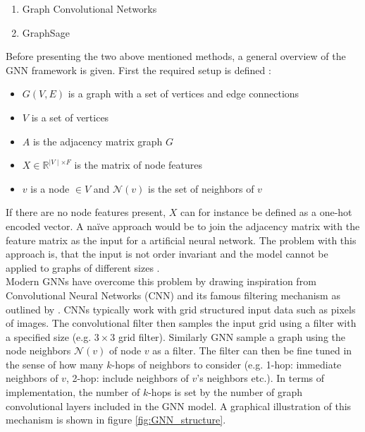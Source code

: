 	\begin{enumerate}
		\item Graph Convolutional Networks
		\item GraphSage
	\end{enumerate}
	
	\noindent Before presenting the two above mentioned methods, a general
	overview of the GNN framework is given. First the required setup is
	defined \citep{leskovec2021lecture}:

	\begin{itemize}
		\item $G(V,E)$ is a graph with a set of vertices and edge connections
		\item $V$ is a set of vertices
		\item $A$ is the adjacency matrix graph $G$
		\item $X \in \mathbb{R}^{\mid V\mid \times F}$ is the matrix of node
			features
		\item $v$ is a node $\in V$ and $\mathcal{N}(v)$ is the set of
			neighbors of $v$
	\end{itemize}

	\noindent If there are no node features present, $X$ can for instance be
	defined as a one-hot encoded vector. A naïve approach would be to join the 
	adjacency matrix with the feature matrix as the input for a artificial
	neural network. The problem with this approach is, that the input is not order 
	invariant and the model cannot be applied to graphs of different sizes
	\citep{leskovec2021lecture}. \\


	\noindent Modern GNNs have overcome this problem by drawing inspiration from 
	Convolutional Neural Networks (CNN) and its famous filtering mechanism as 
	outlined by \cite{krizhevsky2012imagenet}.
	CNNs typically work with grid structured input data such as pixels of
	images. The convolutional filter then samples the input grid using a
	filter with a specified size (e.g. $3\times3$ grid filter). Similarly GNN
	sample a graph using the node neighbors $\mathcal{N}(v)$ of node $v$ as a
	filter. The filter can then be fine tuned in the sense of how many $k$-hops
	of neighbors to consider (e.g. 1-hop: immediate neighbors of $v$, 2-hop:
	include neighbors of $v$'s neighbors etc.). In terms of implementation, the
	number of $k$-hops is set by the number of graph convolutional layers
	included in the GNN model. A graphical illustration of this mechanism is 
	shown in figure \ref{fig:GNN_structure}. \\


